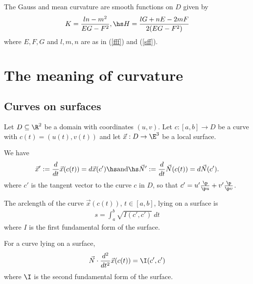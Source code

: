 \documentclass{article}
\begin{document}
\begin{proposition}[Notes 8.5]
    The Gauss and mean curvature are smooth functions on $D$ given by 
    \begin{align*}
        K=\frac{ln-m^2}{EG-F^2},\hs
        H=\frac{lG+nE-2mF}{2(EG-F^2)}
    \end{align*} 
    where $E,F,G$ and $l,m,n$ are as in (\ref{fff}) and (\ref{sff}).
\end{proposition}

\section{The meaning of curvature}

\subsection{Curves on surfaces}

Let $D\subseteq\R^2$ be a domain with coordinates $(u,v)$.
Let $c:[a,b]\to D$ be a curve with $c(t)=(u(t),v(t))$ and let $\vec x: D\to\E^3$ be a 
local surface.

\begin{lemma}[Notes 9.1]
    We have 
    \begin{align*}
        \vec x' := \frac{d}{dt}\vec x(c(t)) = d\vec x(c')\hs\text{and}\hs 
        \vec N' := \frac{d}{dt}\vec N(c(t)) = d\vec N(c').
    \end{align*}
    where $c'$ is the tangent vector to the curve $c$ in $D$, so that 
    $c'=u'\frac{\p }{\p u}+v'\frac{\p }{\p v}$.
\end{lemma}

\begin{proposition}[Notes 9.2]
    The arclength of the curve $\vec x(c(t))$, $t\in[a,b]$, lying on a surface is 
    \begin{align*}
        s = \int_a^b \sqrt{I(c',c')}\:dt
    \end{align*}
    where $I$ is the first fundamental form of the surface.
\end{proposition}

\begin{proposition}[Notes 9.5]
    For a curve lying on a surface,
    \begin{align*}
        \vec N\cdot \frac{d^2}{dt^2}\vec x(c(t)) = \I(c',c')
    \end{align*}
    where $\I$ is the second fundamental form of the surface.
\end{proposition}
\end{document}
